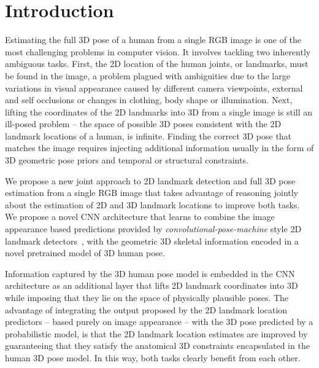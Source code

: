 \documentclass[10pt,twocolumn,letterpaper]{article}
\begin{document}
\section{Introduction}
Estimating the full 3D pose of a human from a single RGB image is one
of the most challenging problems in computer vision. It involves
tackling two inherently ambiguous tasks. First, the 2D location of the
human joints, or landmarks, must be found in the image, a problem
plagued with ambiguities due to the large variations in visual
appearance caused by different camera viewpoints, external and self
occlusions or changes in clothing, body shape or illumination. Next,
lifting the coordinates of the 2D landmarks into 3D from a single
image is still an ill-posed problem -- the space of possible 3D poses
consistent with the 2D landmark locations of a
human, %
is infinite. Finding the %
correct 3D pose that matches the image requires injecting additional
information usually in the form of 3D geometric pose priors and
temporal or structural constraints.



We propose a new joint approach to 2D landmark detection and full 3D
pose estimation from a single RGB image that takes advantage of
reasoning jointly about the estimation of 2D and 3D landmark locations
to improve both tasks.  We propose a novel CNN architecture that
learns to combine the image appearance based predictions provided by
\emph{convolutional-pose-machine} style 2D landmark
detectors~\cite{wei2016convolutional}, with the geometric 3D skeletal
information encoded in a novel pretrained model of 3D human pose. %

Information captured by the 3D human pose model is embedded in the %
CNN architecture as an additional layer that
lifts 2D landmark coordinates into 3D while imposing that they lie on the
space of physically plausible poses. The advantage of integrating the
output proposed by the 2D landmark location predictors -- based purely on
image appearance -- with the 3D pose predicted by a probabilistic model,
is that the 2D landmark location estimates are improved by guaranteeing
that they satisfy the anatomical 3D constraints encapsulated in the
human 3D pose model. In this way, both tasks clearly benefit from each
other.
\end{document}
